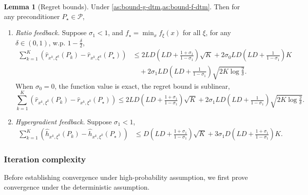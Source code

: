 \documentclass{article}
\theoremstyle{definition}
\newtheorem{lemma}[lemma]{Lemma}
\begin{document}
\begin{lemma}[Regret bounds]
  \label{lem:regret-exact-func} 
  Under \cref{as:bound-g-dtm,as:bound-f-dtm}. Then for any preconditioner $P_{\star} \in \mathcal{P}$,
  \begin{enumerate}
    \item \emph{Ratio feedback.} Suppose $\sigma_1 < 1$, and $f_{\star} = \min_x
    f_{\xi} (x)$ for all $\xi$, for any $\delta \in (0, 1)$, w.p. $1 -
    \frac{\delta}{2}$,
    \begin{align}
      \textstyle \sum_{k = 1}^K (\hat{r}_{x^k, \xi^k} (P_k) - \hat{r}_{x^k, \xi^k}
      (P_{\star})) &{}\leq 2 L D \left( L D + \tfrac{1 + \sigma_1}{1 -
      \sigma_1} \right) \sqrt{K} + 2 \sigma_0 L D \left( L D + \tfrac{1}{1 -
      \sigma_1} \right) K \nonumber\\
      &{}\quad + 2 \sigma_1 L D \left( L D + \tfrac{1}{1 - \sigma_1} \right)
      \sqrt{2 K \log \tfrac{2}{\delta}} . \label{eq:regret-ratio} 
    \end{align}
    When $\sigma_0 = 0$, the function value is exact, the regret bound is
    sublinear,
    \[ \textstyle \sum_{k = 1}^K (\hat{r}_{x^k, \xi^k} (P_k) - \hat{r}_{x^k, \xi^k}
      (P_{\star})) \leq
       2 L D \left( L D + \tfrac{1 + \sigma_1}{1 - \sigma_1} \right) \sqrt{K}
       + 2 \sigma_1 L D \left( L D + \tfrac{1}{1 - \sigma_1} \right) \sqrt{2 K
       \log \tfrac{2}{\delta}} . \]
    \item \emph{Hypergradient feedback.} Suppose $\sigma_1 < 1$,
    \begin{align}
      \textstyle \sum_{k = 1}^K (\hat{h}_{x^k, \xi^k} (P_k) - \hat{h}_{x^k, \xi^k}
      (P_{\star})) &{}\leq D \left( L D + \tfrac{1 + \sigma_1}{1 - \sigma_1}
      \right) \sqrt{K} + 3 \sigma_1 D \left( L D + \tfrac{1 + \sigma_1}{1 -
      \sigma_1} \right) K. \label{eq:regret-hyper} 
    \end{align}
  \end{enumerate}
\end{lemma}

\subsubsection{Iteration complexity}\label{sec:bs-conv}

Before establishing convergence under high-probability assumption, we first
prove convergence under the deterministic assumption.
\end{document}
